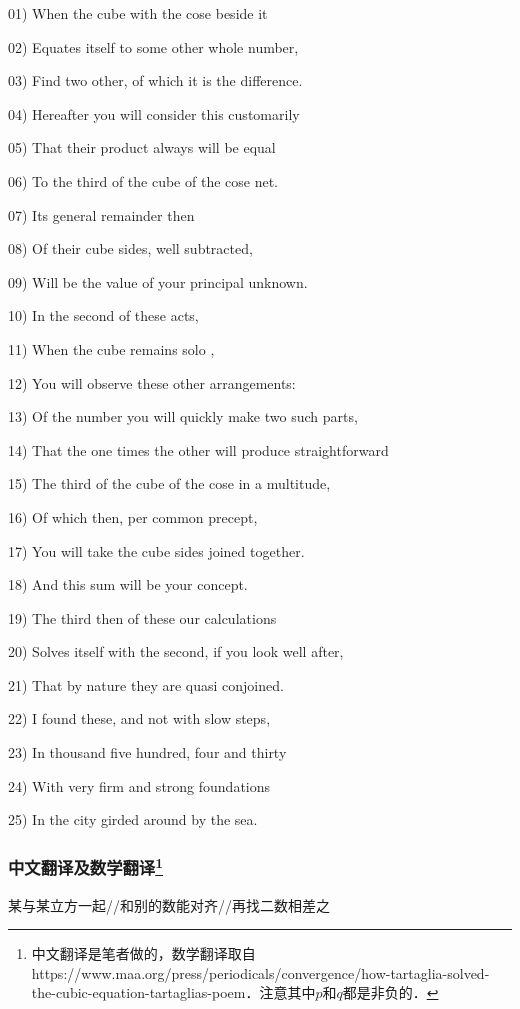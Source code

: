 01) When the cube with the cose beside it 

02) Equates itself to some other whole number,

03) Find two other, of which it is the difference. 

04) Hereafter you will consider this customarily

05) That their product always will be equal 

06) To the third of the cube of the cose net. 

07) Its general remainder then

08) Of their cube sides, well subtracted, 

09) Will be the value of your principal unknown.

10) In the second of these acts,

11) When the cube remains solo , 

12) You will observe these other arrangements:

13) Of the number you will quickly make two such parts,

14) That the one times the other will produce straightforward 

15) The third of the cube of the cose in a multitude, 

16) Of which then, per common precept,

17) You will take the cube sides joined together. 

18) And this sum will be your concept. 

19) The third then of these our calculations 

20) Solves itself with the second, if you look well after,

21) That by nature they are quasi conjoined.

22) I found these, and not with slow steps,

23) In thousand five hundred, four and thirty

24) With very firm and strong foundations

25) In the city girded around by the sea.


\subsubsection{中文翻译及数学翻译\footnote{中文翻译是笔者做的，数学翻译取自https://www.maa.org/press/periodicals/convergence/how-tartaglia-solved-the-cubic-equation-tartaglias-poem．注意其中$p$和$q$都是非负的．}}

某与某立方一起//和别的数能对齐//再找二数相差之

